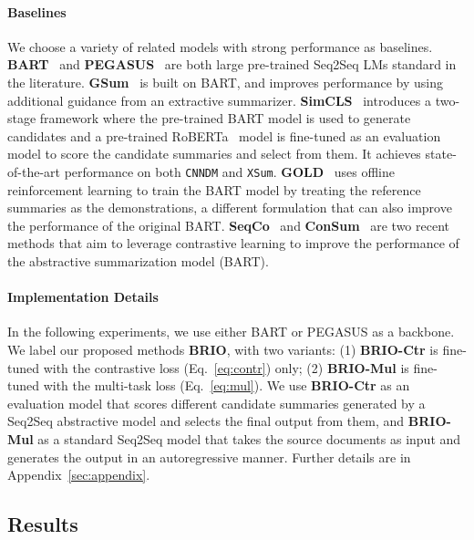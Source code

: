 \documentclass[11pt]{article}
\newcommand{\model}{BRIO\xspace}
\begin{document}
\paragraph{Baselines}

We choose a variety of related models with strong performance as baselines.
\noindent \textbf{BART}~\citep{lewis-etal-2020-bart} and \textbf{PEGASUS}~\citep{zhang2020pegasus} are both large pre-trained Seq2Seq LMs standard in the literature.
\textbf{GSum}~\citep{dou-etal-2021-gsum} is built on BART, and improves performance by using additional guidance from an extractive summarizer.
\textbf{SimCLS}~\citep{liu-liu-2021-simcls} introduces a two-stage framework where the pre-trained BART model is used to generate candidates and a pre-trained RoBERTa~\citep{DBLP:journals/corr/abs-1907-11692} model is fine-tuned as an evaluation model to score the candidate summaries and select from them. It achieves state-of-the-art performance on both \texttt{CNNDM} and \texttt{XSum}.
\textbf{GOLD}~\citep{pang2021text} uses offline reinforcement learning to train the BART model by treating the reference summaries as the demonstrations, a different formulation that can also improve the performance of the original BART.
\textbf{SeqCo}~\citep{DBLP:journals/corr/abs-2109-03481} and \textbf{ConSum}~\citep{DBLP:journals/corr/abs-2108-11846} are two recent methods that aim to leverage contrastive learning to improve the performance of the abstractive summarization model (BART). 

\paragraph{Implementation Details}

In the following experiments, we use either BART or PEGASUS as a backbone.
We label our proposed methods {\textbf{\model}}, with two variants: (1) {\textbf{\model-Ctr}} is fine-tuned with the contrastive loss (Eq.~\ref{eq:contr}) only; (2) {\textbf{\model-Mul}} is fine-tuned with the multi-task loss (Eq.~\ref{eq:mul}).
We use {\textbf{\model-Ctr}} as an evaluation model that scores different candidate summaries generated by a Seq2Seq abstractive model and selects the final output from them, and \textbf{\model-Mul} as a standard Seq2Seq model that takes the source documents as input and generates the output in an autoregressive manner. 
Further details are in Appendix~\ref{sec:appendix}.

\subsection{Results}
\end{document}

